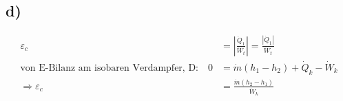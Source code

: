 

\subsection*{d)}
\begin{align*}
\varepsilon_c &= \left| \frac{\dot{Q}_1}{\dot{W}_t} \right| = \frac{|\dot{Q}_1|}{\dot{W}_t} \\
\text{von E-Bilanz am isobaren Verdampfer, D:} \quad 0 &= \dot{m} (h_1 - h_2) + \dot{Q}_k - \dot{W}_k \\
\Rightarrow \varepsilon_c &= \frac{\dot{m} (h_2 - h_1)}{\dot{W}_k}
\end{align*}